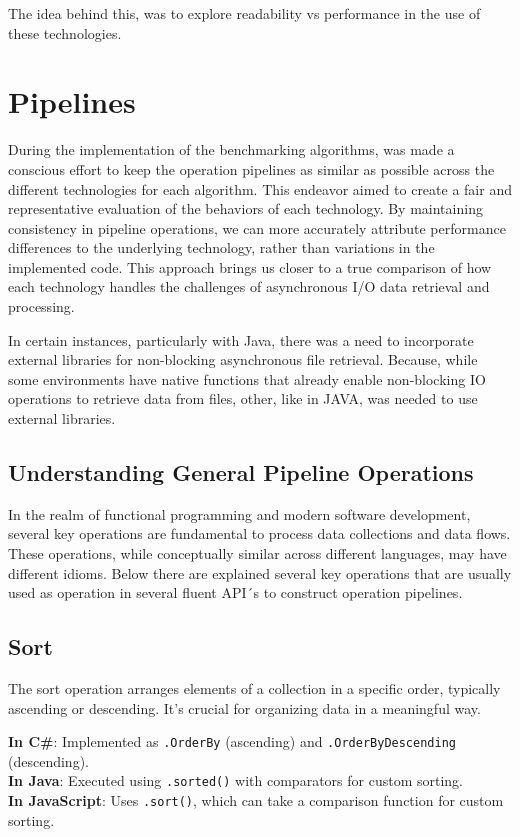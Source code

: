The idea behind this, was to explore readability vs performance in the use of these technologies.


\section{Pipelines}
\label{sec:pipeline_implementations}

During the implementation of the benchmarking algorithms, was made a conscious effort to keep the operation pipelines as similar as possible across the different technologies for each algorithm. This endeavor aimed to create a fair and representative evaluation of the behaviors of each technology. By maintaining consistency in pipeline operations, we can more accurately attribute performance differences to the underlying technology, rather than variations in the implemented code. This approach brings us closer to a true comparison of how each technology handles the challenges of asynchronous I/O data retrieval and processing.

In certain instances, particularly with Java, there was a need to incorporate external libraries for non-blocking asynchronous file retrieval. Because, while some environments have native functions that already enable non-blocking IO operations to retrieve data from files, other, like in JAVA, was needed to use external libraries.


\subsection{Understanding General Pipeline Operations}
\label{sec:understanding_pipeline_operations}

In the realm of functional programming and modern software development, several key operations are fundamental to process data collections and data flows. These operations, while conceptually similar across different languages, may have different idioms. Below there are explained several key operations that are usually used as operation in several fluent API´s to construct operation pipelines.

\subsection*{Sort}
The sort operation arranges elements of a collection in a specific order, typically ascending or descending. It's crucial for organizing data in a meaningful way.

\textbf{In C\#}: Implemented as \texttt{.OrderBy} (ascending) and \texttt{.OrderByDescending} (descending). \\
\textbf{In Java}: Executed using \texttt{.sorted()} with comparators for custom sorting. \\
\textbf{In JavaScript}: Uses \texttt{.sort()}, which can take a comparison function for custom sorting.


